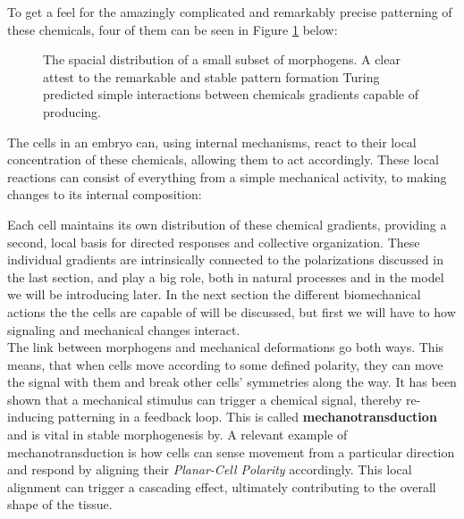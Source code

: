 To get a feel for the amazingly complicated and remarkably precise patterning of these chemicals, four of them can be seen in Figure \ref{fig:MorphogenMap} below:


\noindent

\begin{figure}[H]
    \centering
    \caption{The spacial distribution of a small subset of morphogens. A clear attest to the remarkable and stable pattern formation Turing predicted simple interactions between chemicals gradients capable of producing.}
    \label{fig:MorphogenMap}
\end{figure}

The cells in an embryo can, using internal mechanisms, react to their local concentration of these chemicals, allowing them to act accordingly. These local reactions can consist of everything from a simple mechanical activity, to making changes to its internal composition:

Each cell maintains its own distribution of these chemical gradients, providing a second, local basis for directed responses and collective organization. These individual gradients are intrinsically connected to the polarizations discussed in the last section, and play a big role, both in natural processes and in the model we will be introducing later. In the next section the different biomechanical actions the the cells are capable of will be discussed, but first we will have to how signaling and mechanical changes interact.\\

The link between morphogens and mechanical deformations go both ways. This means, that when cells move according to some defined polarity, they can move the signal with them and break other cells' symmetries along the way. It has been shown that a mechanical stimulus can trigger a chemical signal, thereby re-inducing patterning in a feedback loop. This is called \textbf{mechanotransduction} and is vital in stable morphogenesis\cite{bidhendi2019mechanical} by. A relevant example of mechanotransduction is how cells can sense movement from a particular direction and respond by aligning their \textit{Planar-Cell Polarity} accordingly.\cite{gray2011planar} This local alignment can trigger a cascading effect, ultimately contributing to the overall shape of the tissue.\\


